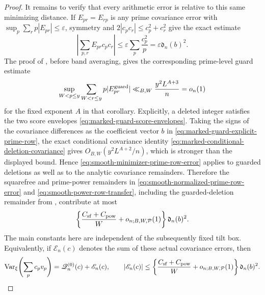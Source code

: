 \documentclass[11pt]{article}
\numberwithin{equation}{section}
\theoremstyle{definition}
\theoremstyle{remark}
\newcommand{\1}{\mathbf 1}
\begin{document}
\begin{proof}
It remains to verify that every arithmetic error is relative to this
same minimizing distance.  If \(E_{pr}=E_{rp}\) is any prime covariance
error with
\(\sup_p\sum_rp|E_{pr}|\leq\varepsilon\), symmetry and
\(2|c_pc_r|\leq c_p^2+c_r^2\) give the exact estimate
\begin{equation}
 \left|\sum_{p,r}E_{pr}c_pc_r\right|
 \leq\varepsilon\sum_p\frac{c_p^2}{p}
 =\varepsilon\mathfrak d_n(b)^2.
 \label{eq:smooth-minimizer-prime-row-error}
\end{equation}
The proof of , before band
averaging, gives the corresponding prime-level guard estimate
\begin{equation}
 \sup_{W<p\leq y}\sum_{W<r\leq y}
       p|E^{\rm guard}_{pr}|
 \ll_{B,W}\frac{y^2L^{A+3}}n=o_n(1)
 \label{eq:smooth-guard-prime-row-error}
\end{equation}
for the fixed exponent \(A\) in that corollary.  Explicitly, a deleted
integer satisfies the two score envelopes
\eqref{eq:marked-guard-score-envelopes}.  Taking the signs of the
covariance differences as the coefficient vector \(b\) in
\eqref{eq:marked-guard-explicit-prime-row}, the exact conditional
covariance identity \eqref{eq:marked-conditional-deletion-covariance}
gives \(O_{B,W}(y^2L^{A+2}/n)\), which is stronger than the displayed
bound.  Hence
\eqref{eq:smooth-minimizer-prime-row-error} applies to guarded deletions
as well as to the analytic covariance remainders.
Therefore the squarefree and prime-power remainders in
\eqref{eq:smooth-normalized-prime-row-error} and
\eqref{eq:smooth-power-row-transfer}, including the guarded-deletion
remainder from , contribute at
most
\[
 \left\{\frac{C_{\rm sf}+C_{\rm pow}}W
       +o_{n;B,W,\mathcal P}(1)\right\}\mathfrak d_n(b)^2.
\]
The main constants here are independent of the subsequently fixed tilt
box.
Equivalently, if \(\mathscr E_n(c)\) denotes the sum of these actual
covariance errors, then
\begin{equation}
 \operatorname{Var}_\xi\!\left(\sum_pc_pv_p\right)
 =\mathscr Q_n^{(0)}(c)+\mathscr E_n(c),\qquad
 |\mathscr E_n(c)|
 \leq\left\{\frac{C_{\rm sf}+C_{\rm pow}}W
       +o_{n;B,W,\mathcal P}(1)\right\}\mathfrak d_n(b)^2.
 \label{eq:smooth-actual-minimizer-covariance-ledger}
\end{equation}


\end{proof}
\end{document}
